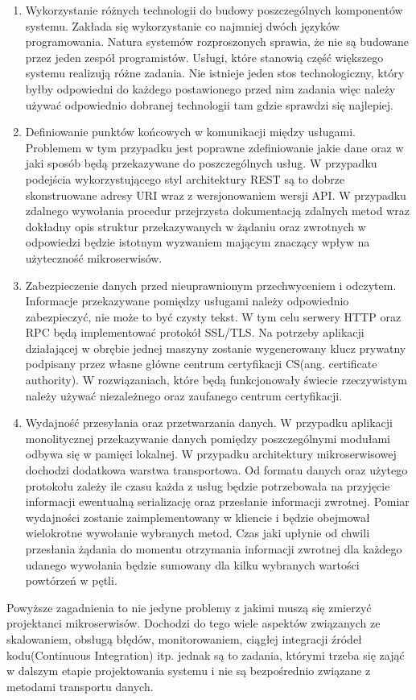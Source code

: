 \begin{enumerate}
	\item Wykorzystanie różnych technologii do budowy poszczególnych komponentów systemu. Zakłada się wykorzystanie co najmniej dwóch języków programowania. Natura systemów rozproszonych sprawia, że nie są budowane przez jeden zespół programistów. Usługi, które stanowią część większego systemu realizują różne zadania. Nie istnieje jeden stos technologiczny, który byłby odpowiedni do każdego postawionego przed nim zadania więc należy używać odpowiednio dobranej technologii tam gdzie sprawdzi się najlepiej.
	\item Definiowanie punktów końcowych w komunikacji między usługami. Problemem w tym przypadku jest poprawne zdefiniowanie jakie dane oraz w jaki sposób będą przekazywane do poszczególnych usług. W przypadku podejścia wykorzystującego styl architektury REST są to dobrze skonstruowane adresy URI wraz z wersjonowaniem wersji API\@. W przypadku zdalnego wywołania procedur przejrzysta dokumentacją zdalnych metod wraz dokładny opis struktur przekazywanych w żądaniu oraz zwrotnych w odpowiedzi będzie istotnym wyzwaniem mającym znaczący wpływ na użyteczność mikroserwisów. 
	\item Zabezpieczenie danych przed nieuprawnionym przechwyceniem i odczytem. Informacje przekazywane pomiędzy usługami należy odpowiednio zabezpieczyć, nie może to być czysty tekst. W tym celu serwery HTTP oraz RPC będą implementować protokół SSL/TLS. Na potrzeby aplikacji działającej w obrębie jednej maszyny zostanie wygenerowany klucz prywatny podpisany przez własne główne centrum certyfikacji CS(ang. certificate authority). W rozwiązaniach, które będą funkcjonowały świecie rzeczywistym należy używać niezależnego oraz zaufanego centrum certyfikacji.
	\item Wydajność przesyłania oraz przetwarzania danych. W przypadku aplikacji monolitycznej przekazywanie danych pomiędzy poszczególnymi modułami odbywa się w pamięci lokalnej. W przypadku architektury mikroserwisowej dochodzi dodatkowa warstwa transportowa. Od formatu danych oraz użytego protokołu zależy ile czasu każda z usług będzie potrzebowała na przyjęcie informacji ewentualną serializację oraz przesłanie informacji zwrotnej. Pomiar wydajności zostanie zaimplementowany w kliencie i będzie obejmował wielokrotne wywołanie wybranych metod. Czas jaki upłynie od chwili przesłania żądania do momentu otrzymania informacji zwrotnej dla każdego udanego wywołania będzie sumowany dla kilku wybranych wartości powtórzeń w pętli. 
\end{enumerate}
\par Powyższe zagadnienia to nie jedyne problemy z jakimi muszą się zmierzyć projektanci mikroserwisów. Dochodzi do tego wiele aspektów związanych ze skalowaniem, obsługą błędów, monitorowaniem, ciągłej integracji źródeł kodu(Continuous Integration) itp. jednak są to zadania, którymi trzeba się zająć w dalszym etapie projektowania systemu i nie są bezpośrednio związane z metodami transportu danych.
